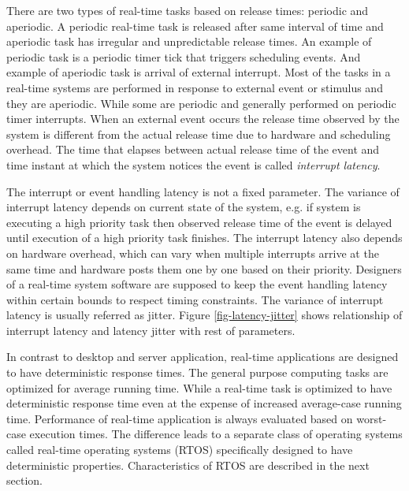 There are two types of real-time tasks based on release times: periodic and aperiodic.
A periodic real-time task is released after same interval of time and aperiodic task has irregular and unpredictable release times.
An example of periodic task is a periodic timer tick that triggers scheduling events.
And example of aperiodic task is arrival of external interrupt.
Most of the tasks in a real-time systems are performed in response to external event or stimulus and they are aperiodic.
While some are periodic and generally performed on periodic timer interrupts.
When an external event occurs the release time observed by the system is different from the actual release time due to hardware and scheduling overhead. 
The time that elapses between actual release time of the event and time instant at which the system notices the event is called \emph{interrupt latency}. 



The interrupt or event handling latency is not a fixed parameter. The variance of interrupt latency depends on current state of the system, e.g. if system is executing a high priority task then observed release time of the event is delayed until execution of a high priority task finishes. 
The interrupt latency also depends on hardware overhead, which can vary when multiple interrupts arrive at the same time and hardware posts them one by one based on their priority.
Designers of a real-time system software are supposed to keep the event handling latency within certain bounds to respect timing constraints. 
The variance of interrupt latency is usually referred as jitter. Figure \ref{fig-latency-jitter} shows relationship of interrupt latency and latency jitter with rest of parameters.

In contrast to desktop and server application, real-time applications are designed to have deterministic response times.
The general purpose computing tasks are optimized for average running time. 
While a real-time task is optimized to have deterministic response time even at the expense of increased average-case running time.
Performance of real-time application is always evaluated based on worst-case execution times.
The difference leads to a separate class of operating systems called real-time operating systems (RTOS) specifically designed to have deterministic properties.
Characteristics of RTOS are described in the next section.


